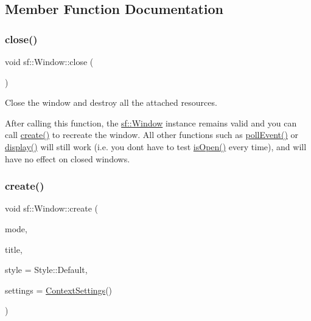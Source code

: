 \subsection{Member Function Documentation}
\mbox{\label{classsf_1_1_window_a99d1e030387b0c26f5995670504fe7b5}} 
\subsubsection{\texorpdfstring{close()}{close()}}
{\footnotesize\ttfamily void sf\+::\+Window\+::close (\begin{DoxyParamCaption}{ }\end{DoxyParamCaption})}



Close the window and destroy all the attached resources. 

After calling this function, the \hyperlink{classsf_1_1_window}{sf\+::\+Window} instance remains valid and you can call \hyperlink{classsf_1_1_window_a30e6edf2162f8dbff61023b9de5d961d}{create()} to recreate the window. All other functions such as \hyperlink{classsf_1_1_window_a338e996585faf82e93069858e3b531b7}{poll\+Event()} or \hyperlink{classsf_1_1_window_adabf839cb103ac96cfc82f781638772a}{display()} will still work (i.\+e. you don\textquotesingle{}t have to test \hyperlink{classsf_1_1_window_ae873503db7d48157bb9cbf6129562bce}{is\+Open()} every time), and will have no effect on closed windows. \mbox{\label{classsf_1_1_window_a30e6edf2162f8dbff61023b9de5d961d}} 
\subsubsection{\texorpdfstring{create()}{create()}\hspace{0.1cm}{\footnotesize\ttfamily [1/2]}}
{\footnotesize\ttfamily void sf\+::\+Window\+::create (\begin{DoxyParamCaption}\item[{\hyperlink{classsf_1_1_video_mode}{Video\+Mode}}]{mode,  }\item[{const \hyperlink{classsf_1_1_string}{String} \&}]{title,  }\item[{Uint32}]{style = {\ttfamily Style\+:\+:Default},  }\item[{const \hyperlink{structsf_1_1_context_settings}{Context\+Settings} \&}]{settings = {\ttfamily \hyperlink{structsf_1_1_context_settings}{Context\+Settings}()} }\end{DoxyParamCaption})}



